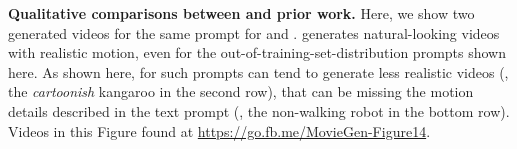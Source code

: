 
\begin{center}
    \centering
    \captionsetup{type=figure}
    
    \vspace{-3mm}
    \caption{\textbf{Qualitative comparisons between \OursVideo and prior work.}
    Here, we show two generated videos for the same prompt for \OursVideo and \Sora.
    \OursVideo generates natural-looking videos with realistic motion, even for the out-of-training-set-distribution prompts shown here.
    As shown here, for such prompts \Sora can tend to generate less realistic videos (\eg, the \textit{cartoonish} kangaroo in the second row), that can be missing the motion details described in the text prompt (\eg, the non-walking robot in the bottom row).
    Videos in this Figure found at \url{https://go.fb.me/MovieGen-Figure14}.
    }
    \label{fig:t2v_qual_prior_work_sora_figure}
\end{center}%

